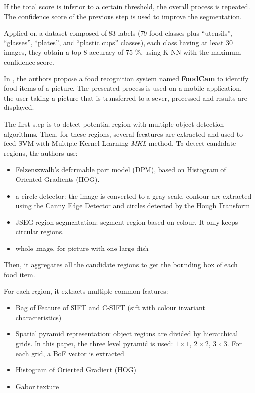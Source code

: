 If the total score is inferior to a certain threshold, the overall process is repeated. The confidence score of the previous step is used to improve the segmentation.

Applied on a dataset composed of 83 labels (79 food classes plus \enquote{utensils}, \enquote{glasses}, \enquote{plates}, and \enquote{plastic cups} classes), each class having at least 30 images, they obtain a top-8 accuracy of 75 \%, using K-NN with the maximum confidence score.


In \cite{Matsuda2012a}, the authors propose a food recognition system named \textbf{FoodCam} to identify food items of a picture. The presented process is used on a mobile application, the user taking a picture that is transferred to a sever, processed and results are displayed.

The first step is to detect potential region with multiple object detection algorithms. Then, for these regions, several feeatures are extracted and used to feed SVM with Multiple Kernel Learning \textit{MKL} method. To detect candidate regions, the authors use:
\begin{itemize}
    \item Felzenszwalb’s deformable part model (DPM), based on Histogram of Oriented Gradients (HOG).
    \item a circle detector: the image is converted to a gray-scale, contour are extracted using the Canny Edge Detector and circles detected by the Hough Transform
    \item JSEG region segmentation: segment region based on colour. It only keeps circular regions.
    \item whole image, for picture with one large dish
\end{itemize}
Then, it aggregates all the candidate regions to get the bounding box of each food item.

For each region, it extracts multiple common features:
\begin{itemize}
    \item Bag of Feature of SIFT and C-SIFT (sift with colour invariant characteristics)
    \item Spatial pyramid representation: object regions are divided by hierarchical grids. In this paper, the three level pyramid is used: $1 \times 1$, $2 \times 2$, $3 \times 3$. For each grid, a BoF vector is extracted
    \item Histogram of Oriented Gradient (HOG)
    \item Gabor texture
\end{itemize}

